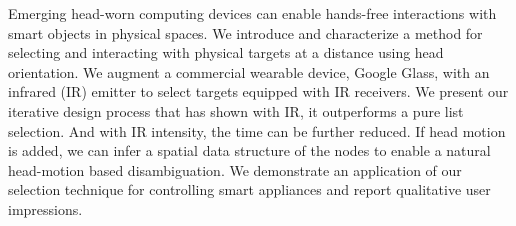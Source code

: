 
Emerging head-worn computing devices can enable hands-free interactions with smart objects in physical spaces. 
%
We introduce and characterize a method for selecting and interacting with physical targets at a distance using head orientation. We augment a commercial wearable device, Google Glass, with an infrared (IR) emitter to select targets equipped with IR receivers. We present our iterative design process that has shown with IR, it outperforms a pure list selection. And with IR intensity, the time can be further reduced. If head motion is added, we can infer a spatial data structure of the nodes to enable a natural head-motion based disambiguation.
We demonstrate an application of our selection technique for controlling smart appliances and report qualitative user impressions.